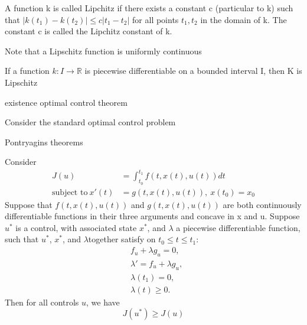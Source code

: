 
\begin{definition}
	A function k is called Lipchitz if there exists a constant c (particular
    to k) such that $|k(t_1) - k(t_2)| \leq c|t_1 - t_2|$ for all points $t_1,
    t_2$ in the domain of k. The constant c is called the Lipchitz constant of 
    k.
\end{definition}

Note that a Lipschitz function is uniformly continuous
\begin{theorem}
	If a function $k : I \rightarrow \mathbb{R}$ is piecewise differentiable on
    a bounded interval I, then K is Lipschitz
\end{theorem}

existence optimal control theorem

\begin{theorem}
    Consider the standard optimal control problem
\end{theorem}
Pontryagins theorems


\begin{theorem}
	Consider
    \begin{align*}
    	J(u) &= \int_{t_0}^{t_1} f(t,x(t),u(t))dt \\
        \text{subject to} \ x'(t) &= g(t,x(t),u(t)), \ x(t_0) = x_0 
    \end{align*}
    Suppose that $f(t,x(t),u(t))$ and $g(t,x(t),u(t))$ are both continuously 
    differentiable functions in their three arguments and concave in x and u. 
    Suppose $u^{*}$ is a control, with associated state $x^{*}$, and $\lambda$
    a piecewise differentiable function, such that $u^{*}$, $x^{*}$, and 
    $\lambda$together satisfy on $t_0 \leq t \leq t_1$:
    \begin{align*}
    	& f_{u} + \lambda g_{u} = 0, \\
        & \lambda ' = f_{u} + \lambda g_{u}, \\
        & \lambda (t_1) = 0, \\
        & \lambda (t) \geq 0.
    \end{align*}
    Then for all controls $u$, we have
    $$
    	J(u^{*}) \geq J(u)
    $$
\end{theorem}

